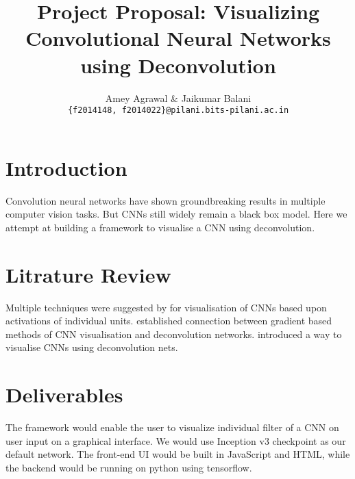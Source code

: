 \documentclass{article} %
\title{ Project Proposal: Visualizing Convolutional Neural
Networks using Deconvolution }
\author{
Amey Agrawal \& Jaikumar Balani \\
\texttt{\{f2014148, f2014022\}@pilani.bits-pilani.ac.in} \\
}
\begin{document}
\maketitle

\section{Introduction}

Convolution neural networks have shown groundbreaking results in multiple
computer vision tasks. But CNNs still widely remain a black box model.
Here we attempt at building a framework to visualise a CNN using
deconvolution.

\section{Litrature Review}

Multiple techniques were suggested by \citet{erhan2009visualizing} for visualisation
of CNNs based upon activations of individual units. \citet{simonyan2013deep} established
connection between gradient based methods of CNN visualisation and deconvolution
networks. \citet{zeiler2014visualizing} introduced a way to visualise CNNs using
deconvolution nets.

\section{Deliverables}
The framework would enable the user to visualize individual filter of a CNN on user
input on a graphical interface. We would use Inception v3 checkpoint as our
default network. The front-end UI would be built in JavaScript and HTML, while
the backend would be running on python using tensorflow.



\end{document}
